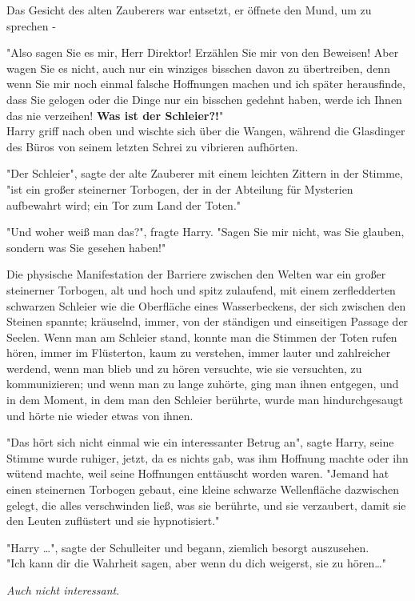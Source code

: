 {Das Gesicht des alten Zauberers war entsetzt, er öffnete den Mund, um zu sprechen -

"Also sagen Sie es mir, Herr Direktor! Erzählen Sie mir von den Beweisen! Aber wagen Sie es nicht, auch nur ein winziges bisschen davon zu übertreiben, denn wenn Sie mir noch einmal falsche Hoffnungen machen und ich später herausfinde, dass Sie gelogen oder die Dinge nur ein bisschen gedehnt haben, werde ich Ihnen das nie verzeihen! \textbf{Was ist der Schleier?!}"\\ Harry griff nach oben und wischte sich über die Wangen, während die Glasdinger des Büros von seinem letzten Schrei zu vibrieren aufhörten.

"Der Schleier", sagte der alte Zauberer mit einem leichten Zittern in der Stimme, "ist ein großer steinerner Torbogen, der in der Abteilung für Mysterien aufbewahrt wird; ein Tor zum Land der Toten."

"Und woher weiß man das?", fragte Harry. "Sagen Sie mir nicht, was Sie glauben, sondern was Sie gesehen haben!"

Die physische Manifestation der Barriere zwischen den Welten war ein großer steinerner Torbogen, alt und hoch und spitz zulaufend, mit einem zerfledderten schwarzen Schleier wie die Oberfläche eines Wasserbeckens, der sich zwischen den Steinen spannte; kräuselnd, immer, von der ständigen und einseitigen Passage der Seelen. Wenn man am Schleier stand, konnte man die Stimmen der Toten rufen hören, immer im Flüsterton, kaum zu verstehen, immer lauter und zahlreicher werdend, wenn man blieb und zu hören versuchte, wie sie versuchten, zu kommunizieren; und wenn man zu lange zuhörte, ging man ihnen entgegen, und in dem Moment, in dem man den Schleier berührte, wurde man hindurchgesaugt und hörte nie wieder etwas von ihnen.

"Das hört sich nicht einmal wie ein interessanter Betrug an", sagte Harry, seine Stimme wurde ruhiger, jetzt, da es nichts gab, was ihm Hoffnung machte oder ihn wütend machte, weil seine Hoffnungen enttäuscht worden waren. "Jemand hat einen steinernen Torbogen gebaut, eine kleine schwarze Wellenfläche dazwischen gelegt, die alles verschwinden ließ, was sie berührte, und sie verzaubert, damit sie den Leuten zuflüstert und sie hypnotisiert."

"Harry …", sagte der Schulleiter und begann, ziemlich besorgt auszusehen.\\ "Ich kann dir die Wahrheit sagen, aber wenn du dich weigerst, sie zu hören…"

\emph{Auch nicht interessant}.

}
